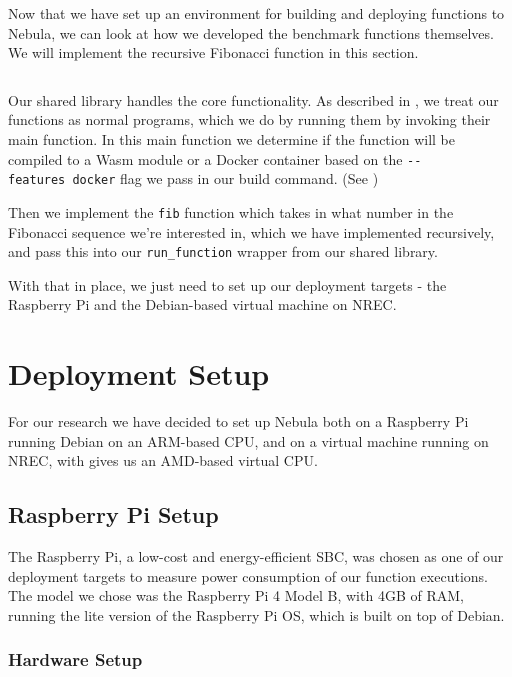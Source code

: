 \documentclass[
  table]{report}
\begin{document}
Now that we have set up an environment for building and deploying
functions to Nebula, we can look at how we developed the benchmark
functions themselves. We will implement the recursive Fibonacci function
in this section.

\inputminted{rust}{assets/code/fib-recursive.rs}

Our shared library handles the core functionality. As described in
, we treat our functions as normal programs, which
we do by running them by invoking their main function. In this main
function we determine if the function will be compiled to a \ac{Wasm}
module or a Docker container based on the \texttt{-\/-features\ docker}
flag we pass in our build command. (See
)

Then we implement the \texttt{fib} function which takes in what number
in the Fibonacci sequence we're interested in, which we have implemented
recursively, and pass this into our \texttt{run\_function} wrapper from
our shared library.

With that in place, we just need to set up our deployment targets - the
Raspberry Pi and the Debian-based virtual machine on \ac{NREC}.

\section{Deployment Setup}

For our research we have decided to set up Nebula both on a Raspberry Pi
running Debian on an ARM-based CPU, and on a virtual machine running on
\ac{NREC}, with gives us an AMD-based virtual CPU.

\subsection{Raspberry Pi Setup}

The Raspberry Pi, a low-cost and energy-efficient \ac{SBC}, was chosen
as one of our deployment targets to measure power consumption of our
function executions. The model we chose was the Raspberry Pi 4 Model B,
with 4GB of RAM, running the lite version of the Raspberry Pi OS, which
is built on top of Debian.

\subsubsection{Hardware Setup}
\end{document}
